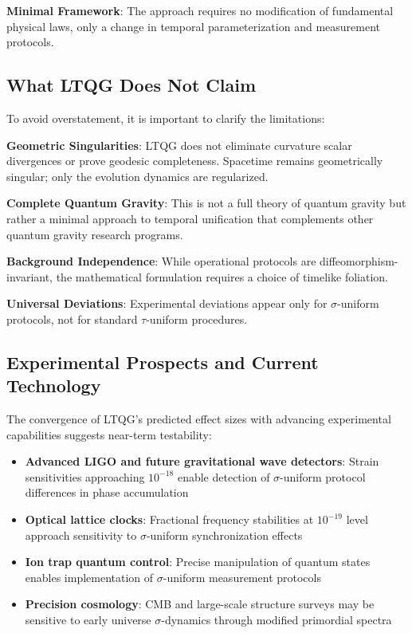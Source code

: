 \documentclass[12pt,a4paper]{article}
\begin{document}
\textbf{Minimal Framework}: The approach requires no modification of fundamental physical laws, only a change in temporal parameterization and measurement protocols.

\subsection{What LTQG Does Not Claim}

To avoid overstatement, it is important to clarify the limitations:

\textbf{Geometric Singularities}: LTQG does not eliminate curvature scalar divergences or prove geodesic completeness. Spacetime remains geometrically singular; only the evolution dynamics are regularized.

\textbf{Complete Quantum Gravity}: This is not a full theory of quantum gravity but rather a minimal approach to temporal unification that complements other quantum gravity research programs.

\textbf{Background Independence}: While operational protocols are diffeomorphism-invariant, the mathematical formulation requires a choice of timelike foliation.

\textbf{Universal Deviations}: Experimental deviations appear only for $\sigma$-uniform protocols, not for standard $\tau$-uniform procedures.

\subsection{Experimental Prospects and Current Technology}

The convergence of LTQG's predicted effect sizes with advancing experimental capabilities suggests near-term testability:

\begin{itemize}
\item \textbf{Advanced LIGO and future gravitational wave detectors}: Strain sensitivities approaching $10^{-18}$ enable detection of $\sigma$-uniform protocol differences in phase accumulation
\item \textbf{Optical lattice clocks}: Fractional frequency stabilities at $10^{-19}$ level approach sensitivity to $\sigma$-uniform synchronization effects  
\item \textbf{Ion trap quantum control}: Precise manipulation of quantum states enables implementation of $\sigma$-uniform measurement protocols
\item \textbf{Precision cosmology}: CMB and large-scale structure surveys may be sensitive to early universe $\sigma$-dynamics through modified primordial spectra
\end{itemize}
\end{document}

